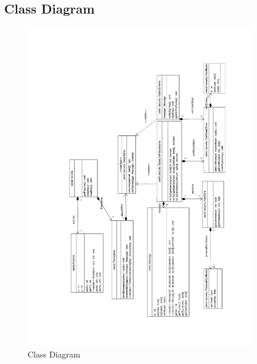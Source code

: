 \subsection{Class Diagram}
\begin{figure}[ht]
\centerline{\includegraphics[width=0.9\textwidth]{class_diagram.pdf}}
\caption{Class Diagram}
\label{fig:class_diagram}
\end{figure}